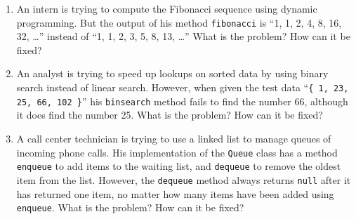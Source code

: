 \documentclass[a4paper]{article}
\begin{document}
\begin{enumerate}
\item
  An intern is trying to compute the Fibonacci sequence using dynamic programming.
  But the output of his method \texttt{fibonacci} is ``1, 1, 2, 4, 8, 16, 32, \ldots'' instead of ``1, 1, 2, 3, 5, 8, 13, \ldots''
  What is the problem?
  How can it be fixed?
\item
  An analyst is trying to speed up lookups on sorted data by using binary search instead of linear search.
  However, when given the test data ``\texttt{\{ 1, 23, 25, 66, 102 \}}'' his \texttt{binsearch} method fails to find the number 66, although it does find the number 25.
  What is the problem?
  How can it be fixed?
\item
  A call center technician is trying to use a linked list to manage queues of incoming phone calls.
  His implementation of the \texttt{Queue} class has a method \texttt{enqueue} to add items to the waiting list, and \texttt{dequeue} to remove the oldest item from the list.
  However, the \texttt{dequeue} method always returns \texttt{null} after it has returned one item, no matter how many items have been added using \texttt{enqueue}.
  What is the problem?
  How can it be fixed?
\end{enumerate}
\end{document}
